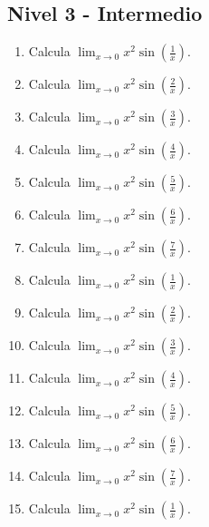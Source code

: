 \documentclass[11pt,a4paper]{article}
\begin{document}
\newpage

\subsection{Nivel 3 - Intermedio}

\begin{enumerate}[label=\textbf{E\arabic*.},start=641]

\item Calcula $\displaystyle\lim_{x\to0}x^2\sin\left(\frac{1}{x}\right)$.

\item Calcula $\displaystyle\lim_{x\to0}x^2\sin\left(\frac{2}{x}\right)$.

\item Calcula $\displaystyle\lim_{x\to0}x^2\sin\left(\frac{3}{x}\right)$.

\item Calcula $\displaystyle\lim_{x\to0}x^2\sin\left(\frac{4}{x}\right)$.

\item Calcula $\displaystyle\lim_{x\to0}x^2\sin\left(\frac{5}{x}\right)$.

\item Calcula $\displaystyle\lim_{x\to0}x^2\sin\left(\frac{6}{x}\right)$.

\item Calcula $\displaystyle\lim_{x\to0}x^2\sin\left(\frac{7}{x}\right)$.

\item Calcula $\displaystyle\lim_{x\to0}x^2\sin\left(\frac{1}{x}\right)$.

\item Calcula $\displaystyle\lim_{x\to0}x^2\sin\left(\frac{2}{x}\right)$.

\item Calcula $\displaystyle\lim_{x\to0}x^2\sin\left(\frac{3}{x}\right)$.

\item Calcula $\displaystyle\lim_{x\to0}x^2\sin\left(\frac{4}{x}\right)$.

\item Calcula $\displaystyle\lim_{x\to0}x^2\sin\left(\frac{5}{x}\right)$.

\item Calcula $\displaystyle\lim_{x\to0}x^2\sin\left(\frac{6}{x}\right)$.

\item Calcula $\displaystyle\lim_{x\to0}x^2\sin\left(\frac{7}{x}\right)$.

\item Calcula $\displaystyle\lim_{x\to0}x^2\sin\left(\frac{1}{x}\right)$.


\end{enumerate}
\end{document}
